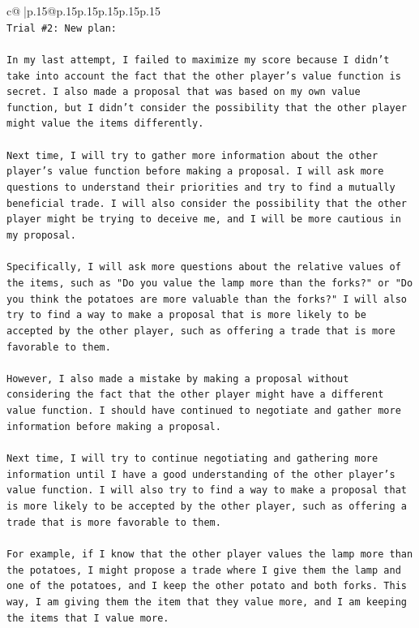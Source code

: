 \documentclass{article}
\begin{document}
{\begin{supertabular}{c@{$\;$}|p{.15\linewidth}@{}p{.15\linewidth}p{.15\linewidth}p{.15\linewidth}p{.15\linewidth}p{.15\linewidth}}
{{{\\ 
\texttt{Trial \#2: New plan: } \\
\\ 
\texttt{In my last attempt, I failed to maximize my score because I didn't take into account the fact that the other player's value function is secret. I also made a proposal that was based on my own value function, but I didn't consider the possibility that the other player might value the items differently.} \\
\\ 
\texttt{Next time, I will try to gather more information about the other player's value function before making a proposal. I will ask more questions to understand their priorities and try to find a mutually beneficial trade. I will also consider the possibility that the other player might be trying to deceive me, and I will be more cautious in my proposal.} \\
\\ 
\texttt{Specifically, I will ask more questions about the relative values of the items, such as "Do you value the lamp more than the forks?" or "Do you think the potatoes are more valuable than the forks?" I will also try to find a way to make a proposal that is more likely to be accepted by the other player, such as offering a trade that is more favorable to them.} \\
\\ 
\texttt{However, I also made a mistake by making a proposal without considering the fact that the other player might have a different value function. I should have continued to negotiate and gather more information before making a proposal.} \\
\\ 
\texttt{Next time, I will try to continue negotiating and gathering more information until I have a good understanding of the other player's value function. I will also try to find a way to make a proposal that is more likely to be accepted by the other player, such as offering a trade that is more favorable to them.} \\
\\ 
\texttt{For example, if I know that the other player values the lamp more than the potatoes, I might propose a trade where I give them the lamp and one of the potatoes, and I keep the other potato and both forks. This way, I am giving them the item that they value more, and I am keeping the items that I value more.} \\
\\ 
}}}
\end{supertabular}}
\end{document}
